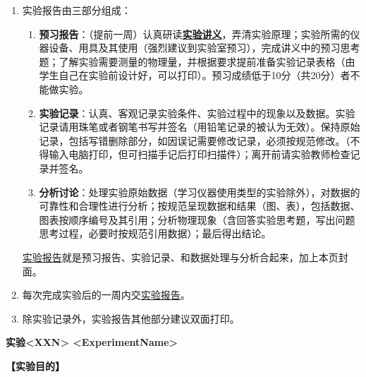 \documentclass{ctexart}
\numberwithin{equation}{section}%
\newcommand{\ExpTitle}{实验<XXN> <ExperimentName>}
\theoremstyle{ansstyle}
\begin{document}
\begin{enumerate}
    \item 实验报告由三部分组成：
    \begin{enumerate}
        \item \textbf{预习报告}：（提前一周）认真研读\underline{\textbf{实验讲义}}，弄清实验原理；实验所需的仪器设备、用具及其使用（强烈建议到实验室预习），完成讲义中的预习思考题；了解实验需要测量的物理量，并根据要求提前准备实验记录表格（由学生自己在实验前设计好，可以打印）。预习成绩低于10分（共20分）者不能做实验。
        \item \textbf{实验记录}：认真、客观记录实验条件、实验过程中的现象以及数据。实验记录请用珠笔或者钢笔书写并签名（{\color{red}用铅笔记录的被认为无效}）。{\color{red}保持原始记录，包括写错删除部分，如因误记需要修改记录，必须按规范修改。}（不得输入电脑打印，但可扫描手记后打印扫描件）；离开前请实验教师检查记录并签名。
        \item \textbf{分析讨论}：处理实验原始数据（学习仪器使用类型的实验除外），对数据的可靠性和合理性进行分析；按规范呈现数据和结果（图、表），包括数据、图表按顺序编号及其引用；分析物理现象（含回答实验思考题，写出问题思考过程，必要时按规范引用数据）；最后得出结论。
    \end{enumerate}
    \underline{实验报告}就是预习报告、实验记录、和数据处理与分析合起来，加上本页封面。
    \item 每次完成实验后的一周内交\underline{实验报告}。
    \item 除实验记录外，实验报告其他部分建议双面打印。
\end{enumerate}




\newpage
\tableofcontents

\begin{center}
    \LARGE{\textbf{\ExpTitle}}
\end{center}


\large{\textbf{【实验目的】}}%
\end{document}
